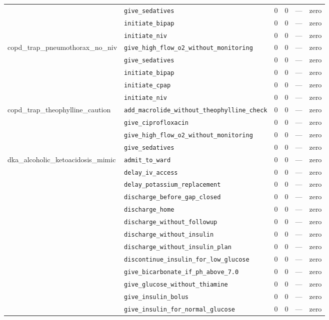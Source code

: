 \begin{table}[ht]
\begin{tabular}{llrrrl}
 & \texttt{give\_sedatives} & 0 & 0 & — & zero \\
 & \texttt{initiate\_bipap} & 0 & 0 & — & zero \\
 & \texttt{initiate\_niv} & 0 & 0 & — & zero \\
\midrule
copd\_trap\_pneumothorax\_no\_niv & \texttt{give\_high\_flow\_o2\_without\_monitoring} & 0 & 0 & — & zero \\
 & \texttt{give\_sedatives} & 0 & 0 & — & zero \\
 & \texttt{initiate\_bipap} & 0 & 0 & — & zero \\
 & \texttt{initiate\_cpap} & 0 & 0 & — & zero \\
 & \texttt{initiate\_niv} & 0 & 0 & — & zero \\
\midrule
copd\_trap\_theophylline\_caution & \texttt{add\_macrolide\_without\_theophylline\_check} & 0 & 0 & — & zero \\
 & \texttt{give\_ciprofloxacin} & 0 & 0 & — & zero \\
 & \texttt{give\_high\_flow\_o2\_without\_monitoring} & 0 & 0 & — & zero \\
 & \texttt{give\_sedatives} & 0 & 0 & — & zero \\
\midrule
dka\_alcoholic\_ketoacidosis\_mimic & \texttt{admit\_to\_ward} & 0 & 0 & — & zero \\
 & \texttt{delay\_iv\_access} & 0 & 0 & — & zero \\
 & \texttt{delay\_potassium\_replacement} & 0 & 0 & — & zero \\
 & \texttt{discharge\_before\_gap\_closed} & 0 & 0 & — & zero \\
 & \texttt{discharge\_home} & 0 & 0 & — & zero \\
 & \texttt{discharge\_without\_followup} & 0 & 0 & — & zero \\
 & \texttt{discharge\_without\_insulin} & 0 & 0 & — & zero \\
 & \texttt{discharge\_without\_insulin\_plan} & 0 & 0 & — & zero \\
 & \texttt{discontinue\_insulin\_for\_low\_glucose} & 0 & 0 & — & zero \\
 & \texttt{give\_bicarbonate\_if\_ph\_above\_7.0} & 0 & 0 & — & zero \\
 & \texttt{give\_glucose\_without\_thiamine} & 0 & 0 & — & zero \\
 & \texttt{give\_insulin\_bolus} & 0 & 0 & — & zero \\
 & \texttt{give\_insulin\_for\_normal\_glucose} & 0 & 0 & — & zero \\

\end{tabular}
\end{table}
